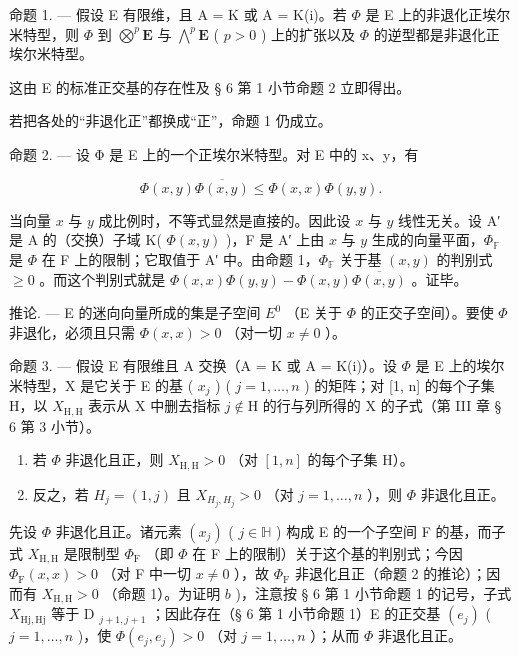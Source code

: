 命题 1. --- 假设 E 有限维，且 A = K 或 A = K(i)。若 \(\Phi\) 是 E 上的非退化正埃尔米特型，则 \(\Phi\) 到 \(\bigotimes^{p}\mathbf{E}\) 与 \(\bigwedge^{p}\mathbf{E}\) ( \(p > 0\) ) 上的扩张以及 \(\Phi\) 的逆型都是非退化正埃尔米特型。

这由 E 的标准正交基的存在性及 § 6 第 1 小节命题 2 立即得出。

若把各处的“非退化正”都换成“正”，命题 1 仍成立。

命题 2. --- 设 Φ 是 E 上的一个正埃尔米特型。对 E 中的 x、y，有

\[
\Phi (x, y) \overline {{{{\Phi (x , y)}}}} \leqslant \Phi (x, x) \Phi (y, y).\tag{1}
\]

当向量 \(x\) 与 \(y\) 成比例时，不等式显然是直接的。因此设 \(x\) 与 \(y\) 线性无关。设 A′ 是 A 的（交换）子域 K( \(\Phi(x, y)\) )，F 是 A′ 上由 \(x\) 与 \(y\) 生成的向量平面，\(\Phi_{\mathbb{F}}\) 是 \(\Phi\) 在 F 上的限制；它取值于 A′ 中。由命题 1，\(\Phi_{\mathbb{F}}\) 关于基 \((x, y)\) 的判别式 \(\geqslant 0\) 。而这个判别式就是 \(\Phi(x, x)\Phi(y, y) - \Phi(x, y)\overline{\Phi(x, y)}\) 。证毕。

推论. --- E 的迷向向量所成的集是子空间 \(E^{0}\) （E 关于 \(\Phi\) 的正交子空间）。要使 \(\Phi\) 非退化，必须且只需 \(\Phi(x, x) > 0\) （对一切 \(x \neq 0\) ）。

命题 3. --- 假设 E 有限维且 A 交换（A = K 或 A = K(i)）。设 \(\Phi\) 是 E 上的埃尔米特型，X 是它关于 E 的基 ( \(x_j\) ) ( \(j = 1, \ldots, n\) ) 的矩阵；对 {[}1, n{]} 的每个子集 H，以 \(X_{\mathrm{H,H}}\) 表示从 X 中删去指标 \(j \notin \mathrm{H}\) 的行与列所得的 X 的子式（第 III 章 § 6 第 3 小节）。

\begin{enumerate}
\def\labelenumi{\alph{enumi})}
\item
  若 \(\Phi\) 非退化且正，则 \(X_{\mathrm{H,H}} > 0\) （对 \([1, n]\) 的每个子集 H）。
\item
  反之，若 \(H_{j} = (1, j)\) 且 \(X_{H_{j}, H_{j}} > 0\) （对 \(j = 1, \ldots, n\) ），则 \(\Phi\) 非退化且正。
\end{enumerate}

先设 \(\Phi\) 非退化且正。诸元素 \((x_{j})\) ( \(j\in\mathbb{H}\) ) 构成 E 的一个子空间 F 的基，而子式 \(X_{\mathrm{H,H}}\) 是限制型 \(\Phi_{\mathrm{F}}\) （即 \(\Phi\) 在 F 上的限制）关于这个基的判别式；今因 \(\Phi_{\mathrm{F}}(x,x)>0\) （对 F 中一切 \(x\neq0\) ），故 \(\Phi_{\mathrm{F}}\) 非退化且正（命题 2 的推论）；因而有 \(X_{\mathrm{H,H}}>0\) （命题 1）。为证明 \(b\) )，注意按 § 6 第 1 小节命题 1 的记号，子式 \(X_{\mathrm{Hj,Hj}}\) 等于 D \(_{j+1,j+1}\) ；因此存在（§ 6 第 1 小节命题 1）E 的正交基 \((e_{j})\) ( \(j=1,\ldots,n\) )，使 \(\Phi(e_{j},e_{j})>0\) （对 \(j=1,\ldots,n\) ）；从而 \(\Phi\) 非退化且正。

